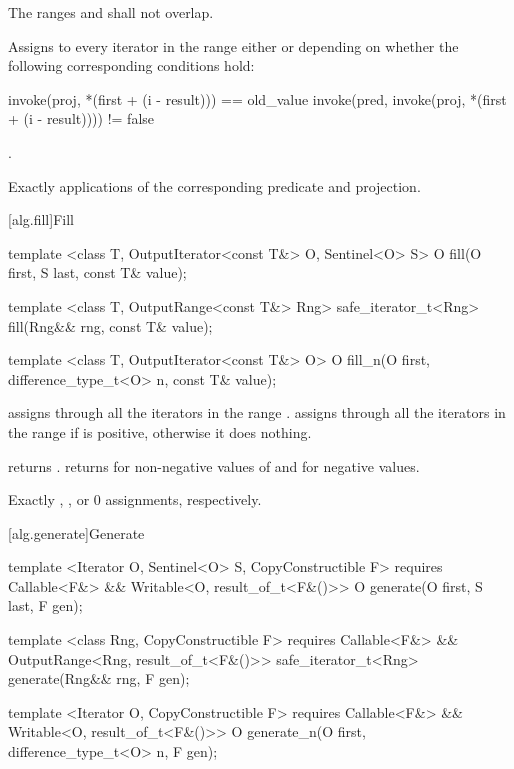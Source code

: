 \begin{itemdescr}
\pnum
\requires
The ranges
and
shall not overlap.

\pnum
\effects
Assigns to every iterator
in the
range
either
or
depending on whether the following corresponding conditions hold:

\begin{codeblock}
invoke(proj, *(first + (i - result))) == old_value
invoke(pred, invoke(proj, *(first + (i - result)))) != false
\end{codeblock}

\pnum
\returns
{}.

\pnum
\complexity
Exactly
applications of the corresponding predicate and projection.
\end{itemdescr}

[alg.fill]{Fill}

%
%
\begin{itemdecl}
template <class T, OutputIterator<const T&> O, Sentinel<O> S>
  O fill(O first, S last, const T& value);

template <class T, OutputRange<const T&> Rng>
  safe_iterator_t<Rng>
    fill(Rng&& rng, const T& value);

template <class T, OutputIterator<const T&> O>
  O fill_n(O first, difference_type_t<O> n, const T& value);
\end{itemdecl}

\begin{itemdescr}
\pnum
\effects
{} assigns  through all the
iterators in the range . 
assigns  through all the iterators in the range 
if  is positive, otherwise it does nothing.

\pnum
\returns {} returns .  returns 
for non-negative values of  and  for negative values.

\pnum
\complexity
Exactly
,
, or 0 assignments, respectively.
\end{itemdescr}

[alg.generate]{Generate}

%
%
\begin{itemdecl}
template <Iterator O, Sentinel<O> S, CopyConstructible F>
    requires Callable<F&> && Writable<O, result_of_t<F&()>>
  O generate(O first, S last, F gen);

template <class Rng, CopyConstructible F>
    requires Callable<F&> && OutputRange<Rng, result_of_t<F&()>>
  safe_iterator_t<Rng>
    generate(Rng&& rng, F gen);

template <Iterator O, CopyConstructible F>
    requires Callable<F&> && Writable<O, result_of_t<F&()>>
  O generate_n(O first, difference_type_t<O> n, F gen);
\end{itemdecl}

